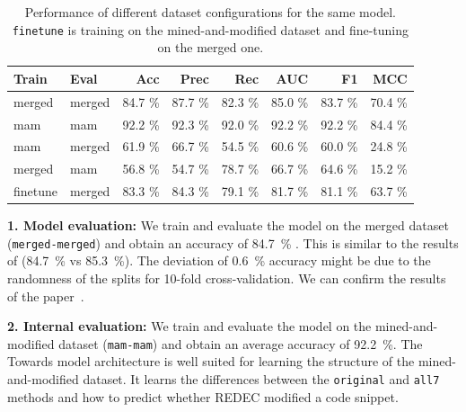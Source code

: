 \documentclass[%
class=scrreprt,
chapterprefix=false,%
open=right,%
twoside=true,%
paper=a4,%
logofile={Logo\_zentral\_farbig\_EN.png},%
thesistype=master,%
UKenglish,%
]{se2thesis}
\theoremstyle{definition}
\newcommand{\rdh}{REDEC\xspace}
\begin{document}
	\begin{table}[tb]
		\centering
		\caption{Performance of different dataset configurations for the same model. 
		\texttt{finetune} is training on the mined-and-modified dataset and fine-tuning on the merged one.
		}
		\label{tab:dataset_performance}
		\begin{tabular}{llrrrrrr}
			\toprule
			Train & Eval & Acc & Prec & Rec & AUC & F1 & MCC \\
			\midrule
			merged      & merged   	& 84.7 \% & 87.7 \% & 82.3 \% & 85.0 \% & 83.7 \% & 70.4 \% \\
			mam        	& mam    	& 92.2 \% & 92.3 \% & 92.0 \% & 92.2 \% & 92.2 \% & 84.4 \% \\
			mam			& merged    & 61.9 \% & 66.7 \% & 54.5 \% & 60.6 \% & 60.0 \% & 24.8 \% \\
			merged      & mam	    & 56.8 \% & 54.7 \% & 78.7 \% & 66.7 \% & 64.6 \% & 15.2 \% \\
			finetune	& merged    & 83.3 \% & 84.3 \% & 79.1 \% & 81.7 \% & 81.1 \% & 63.7 \% \\
			\bottomrule
		\end{tabular}
	\end{table}

	\textbf{1. Model evaluation:}
	We train and evaluate the model on the merged dataset (\texttt{merged-merged}) and obtain an accuracy of 84.7~\% . This is similar to the results of \citeauthor{mi2022towards} (84.7~\% vs 85.3~\%). The deviation of 0.6~\% accuracy might be due to the randomness of the splits for 10-fold cross-validation. We can confirm the results of the paper~\cite{mi2022towards}.
	
	\textbf{2. Internal evaluation:}
	We train and evaluate the model on the mined-and-modified dataset (\texttt{mam-mam}) and obtain an average accuracy of 92.2~\%.
	The Towards model architecture is well suited for learning the structure of the mined-and-modified dataset. It learns the differences between the \texttt{original} and \texttt{all7} methods and how to predict whether \rdh modified a code snippet. 
\end{document}
